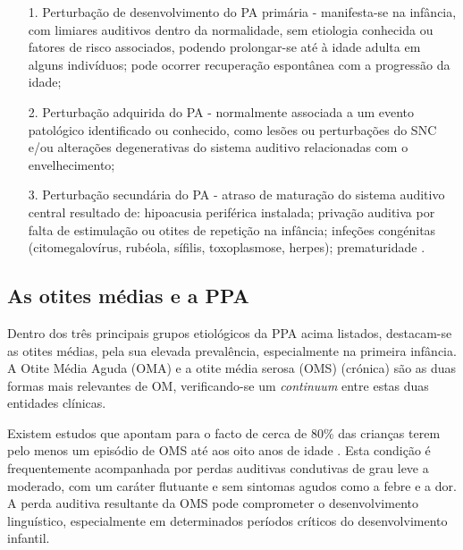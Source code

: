 \documentclass[output=paper,colorlinks,citecolor=brown,booklanguage=portuguese]{langscibook}
\begin{document}
\begin{enumerate}[align=left]
    \item [1.]  Perturbação de desenvolvimento do PA primária - manifesta-se na infância, com limiares auditivos dentro da normalidade, sem etiologia conhecida ou fatores de risco associados, podendo prolongar-se até à idade adulta em alguns indivíduos; pode ocorrer recuperação espontânea com a progressão da idade; 
\item[2.]	Perturbação adquirida do PA - normalmente associada a um evento patológico identificado ou conhecido, como lesões ou perturbações do SNC e/ou alterações degenerativas do sistema auditivo relacionadas com o envelhecimento;
\item[3.]	Perturbação secundária do PA - atraso de maturação do sistema auditivo central resultado de: hipoacusia periférica instalada; privação auditiva por falta de estimulação ou otites de repetição na infância; infeções congénitas (citomegalovírus, rubéola, sífilis, toxoplasmose, herpes); prematuridade \citep{BSA2007}.
\end{enumerate}

\subsection{As otites médias e a PPA}
Dentro dos três principais grupos etiológicos da PPA acima listados, destacam-se as otites médias, pela sua elevada prevalência, especialmente na primeira infância. A Otite Média Aguda (OMA) e a otite média serosa (OMS) (crónica) são as duas formas mais relevantes de OM, verificando-se um \emph{continuum} entre estas duas entidades clínicas.

Existem estudos que apontam para o facto de cerca de 80\% das crianças terem pelo menos um episódio de OMS até aos oito anos de idade \citep{Bluestone2004}. Esta condição é frequentemente acompanhada por perdas auditivas condutivas de grau leve a moderado, com um caráter flutuante e sem sintomas agudos como a febre e a dor. A perda auditiva resultante da OMS pode comprometer o desenvolvimento linguístico, especialmente em determinados períodos críticos do desenvolvimento infantil. 
\end{document}
